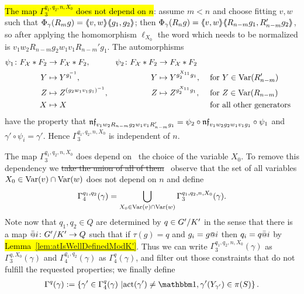 \documentclass[a4paper,11pt]{amsart}
\newcommand\replace[2]{\st{#1}{\color{Green4}\ #2}}
\begin{document}
 \hl{The map $\Gamma_3^{q_1,q_2,n,X_0}$ does not depend on $n$}: assume 
 $m<n$ and choose fitting $v,w$ such that
 $\Phi_\gamma(R_mg)=\langle\negthickspace\langle v,w\rangle\negthickspace\rangle\langle\negthickspace\langle g_1,g_2\rangle\negthickspace\rangle$; then
 $\Phi_\gamma(R_ng)=\langle\negthickspace\langle v,w\rangle\negthickspace\rangle\langle\negthickspace\langle R_{n-m}g_1,R_{n-m}'g_2\rangle\negthickspace\rangle$, so after
 applying the homomorphism $\ell_{X_0}$ the word which needs to be
 normalized is $v_1w_2R_{n-m}g_2w_1v_1R_{n-m}'g_1$. The automorphisms
 \begin{align*}
 \psi_1 \colon F_{\mathcal{X}}*F_2 &\to F_{\mathcal{X}}*F_2, & \psi_2 \colon F_{\mathcal{X}}*F_2 &\to F_{\mathcal{X}}*F_2\\
 Y &\mapsto Y^{g_1^{-1}}, & Y &\mapsto Y^{g_2^{X_{11}}g_1}, & &\text{ for }Y\in \textup{Var}(R_{n-m}')\\
 Z &\mapsto Z^{(g_2w_1v_1g_1)^{-1}},& Z &\mapsto Z^{g_2^{X_{11}}g_1},  & &\text{ for }Z\in \textup{Var}(R_{n-m})\\
 X &\mapsto X & & & &\text{ for all other generators}
 \end{align*}
 have the property that $\mathfrak{nf}_{v_1w_2R_{n-m}g_2w_1v_1R_{n-m}'g_1} = \psi_2\circ\mathfrak{nf}_{v_1w_2g_2w_1v_1g_1}\circ \psi_1$ and 
 $\gamma' \circ \psi_i = \gamma'$. Hence $\Gamma_3^{q_1,q_2,n,X_0}$ is independent of $n$.
 
 The map $\Gamma_3^{q_1,q_2,n,X_0}$ does depend on \replace{}{the choice of the variable} $X_0$. To remove this dependency we
\replace{take the union of all of them }{observe that the set of all variables $X_0 \in \textup{Var}(v)\cap \textup{Var}(w)$ does not depend on $n$}
and define
  \[\Gamma_4^{q_1,q_2}(\gamma)=  \bigcup_{X_0\in \textup{Var}(v)\cap\textup{Var}(w)}\Gamma_3^{q_1,q_2,n,X_0}(\gamma).\]
  Note now that $q_{1},q_2\in Q$ are determined by $q\in{G'/K'}$
  in the sense that there is a map $\att{i}\colon \RNK{G'}{K'}\to Q$
  such that if $\tau(g) = q$ and $g_i=g\at{i}$ then $q_i = q\att{i}$
  by \hl{{Lemma~\ref{lem:atIsWellDefinedModK'}}}.  Thus we can write 
  $\Gamma_3^{q_1,q_2,n,X_0}(\gamma)$ as $\Gamma_3^{q,X_0}(\gamma)$ and
  $\Gamma_4^{q_1,q_2}(\gamma)$ as $\Gamma_4^q(\gamma)$, and filter out
  those constraints that do not fulfill the requested properties; we
  finally define
 \begin{align}
 \Gamma^q(\gamma) := \left\{\gamma' \in \Gamma_4^q(\gamma) \bigmid 
  \act(\gamma')\neq\id, \gamma'({Y_{\gamma'}}) \in \pi(S) \right\}. 
  \label{def:Gammaq}
 \end{align}
\end{document}
